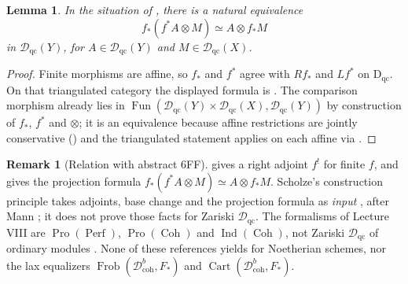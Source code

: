 \documentclass[11pt]{amsart}
\newcommand{\cD}{\mathcal{D}}
\newcommand{\Cart}{\operatorname{Cart}}
\newcommand{\Coh}{\operatorname{{Coh}}}
\DeclareMathOperator{\Fun}{\mathrm{Fun}}
\newcommand{\Pro}{\operatorname{Pro}}
\newcommand{\Ind}{\operatorname{Ind}}
\newcommand{\Perf}{\operatorname{Perf}}
\newcommand{\Frob}{\operatorname{Frob}}
\newcommand{\Dqc}{\mathcal D_{\mathrm{qc}}}
\newcommand{\Dbc}{\mathcal D^b_{\mathrm{coh}}}
\theoremstyle{plain}
\newtheorem{lemma}[lemma]{Lemma}
\theoremstyle{definition}
\newtheorem{remark}[remark]{Remark}
\numberwithin{equation}{section}
\begin{document}
\begin{lemma}\label{lem:projection}
In the situation of , there is a natural equivalence
\[
 f_*(f^*A\otimes M)\simeq A\otimes f_*M
\]
in $\Dqc(Y)$, for $A\in\Dqc(Y)$ and $M\in\Dqc(X)$.
\end{lemma}
\begin{proof}
Finite morphisms are affine, so $f_*$ and $f^*$ agree with $Rf_*$ and $Lf^*$ on $\mathrm D_{\mathrm{qc}}$.
On that triangulated category the displayed formula is \cite[\href{https://stacks.math.columbia.edu/tag/08EU}{Tag 08EU}]{SP}.
The comparison morphism already lies in $\Fun(\Dqc(Y)\times\Dqc(X),\Dqc(Y))$ by construction of $f_*$, $f^*$ and $\otimes$; it is an equivalence because affine restrictions are jointly conservative () and the triangulated statement applies on each affine via .
\end{proof}

\begin{remark}[Relation with abstract 6FF]
\label{rem:no-6ff-import}
 gives a right adjoint $f^!$ for finite $f$, and  gives the projection formula $f_*(f^*A\otimes M)\simeq A\otimes f_*M$.
Scholze's construction principle takes adjoints, base change and the projection formula as \emph{input} \cite[Theorem 4.6]{Scholze-6ff}, after Mann \cite[Proposition A.5.10]{Mann}; it does not prove those facts for Zariski $\Dqc$.
The formalisms of Lecture VIII are $\Pro(\Perf)$, $\Pro(\Coh)$ and $\Ind(\Coh)$, not Zariski $\Dqc$ of ordinary modules \cite[Theorem 8.21; \S8.5--8.7]{Scholze-6ff}.
None of these references yields  for Noetherian schemes, nor the lax equalizers $\Frob(\Dbc,F_*)$ and $\Cart(\Dbc,F_*)$.
\end{remark}
\end{document}
